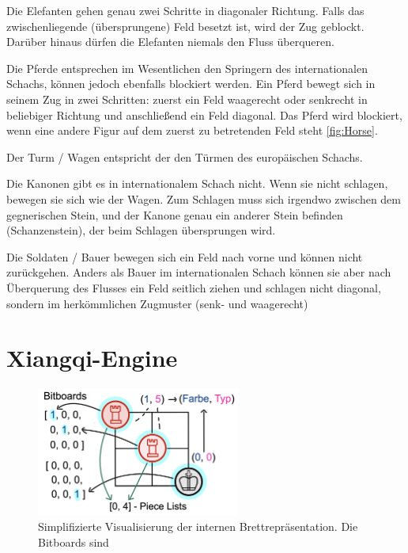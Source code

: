 \documentclass{jpp}
\begin{document}
Die Elefanten gehen genau zwei Schritte in diagonaler Richtung. Falls das zwischenliegende (übersprungene) Feld besetzt ist, wird der Zug geblockt. Darüber hinaus dürfen die Elefanten niemals den Fluss überqueren.

Die Pferde entsprechen im Wesentlichen den Springern des internationalen Schachs, können jedoch ebenfalls blockiert werden. Ein Pferd bewegt sich in seinem Zug in zwei Schritten: zuerst ein Feld waagerecht oder senkrecht in beliebiger Richtung und anschließend ein Feld diagonal. Das Pferd wird blockiert, wenn eine andere Figur auf dem zuerst zu betretenden Feld steht \ref{fig:Horse}.

 Der Turm / Wagen entspricht der den Türmen des europäischen Schachs. 
 
 Die Kanonen gibt es in internationalem Schach nicht. Wenn sie nicht schlagen, bewegen sie sich wie der Wagen. Zum Schlagen muss sich irgendwo zwischen dem gegnerischen Stein, und der Kanone genau ein anderer Stein befinden (Schanzenstein), der beim Schlagen übersprungen wird.
 
 Die Soldaten / Bauer bewegen sich ein Feld nach vorne und können nicht zurückgehen. Anders als Bauer im internationalen Schach können sie aber nach Überquerung des Flusses ein Feld seitlich ziehen und schlagen nicht diagonal, sondern im herkömmlichen Zugmuster (senk- und waagerecht)

\section{Xiangqi-Engine}
\begin{figure}
    \centering
    \includegraphics[width={0.6\textwidth}]{imgs/Board repr.png}
    \caption{Simplifizierte Visualisierung der internen Brettrepräsentation. Die Bitboards sind }
    \label{fig:repr}
\end{figure}
\end{document}
